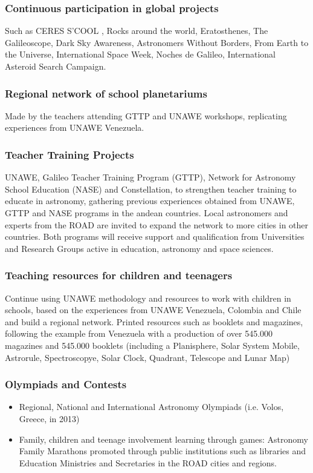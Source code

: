 \documentclass[12pt]{article}
\begin{document}
\subsubsection*{Continuous participation in  global projects} 

Such as  CERES S'COOL , Rocks around the world,  Eratosthenes, The
Galileoscope,  Dark Sky Awareness, Astronomers Without Borders, From
Earth to the Universe, International Space Week,   Noches de Galileo,
International Asteroid Search Campaign. 

\subsubsection*{Regional network of school planetariums} 

Made by the teachers attending GTTP and UNAWE workshops, replicating
experiences from UNAWE Venezuela.  

\subsubsection*{Teacher Training Projects}
UNAWE, Galileo Teacher Training Program (GTTP), Network for Astronomy
School Education (NASE) and Constellation, to strengthen teacher
training to educate in astronomy, gathering previous experiences
obtained from UNAWE, GTTP and NASE programs in the andean
countries. Local astronomers and experts from the ROAD are
invited to expand the network to more cities in other countries. Both
programs will receive support and qualification from Universities and
Research Groups active in education, astronomy and space sciences. 

\subsubsection*{Teaching resources for children and teenagers}
Continue using UNAWE methodology and resources to work with children
in schools, based on the experiences from  UNAWE Venezuela, Colombia
and Chile and build a regional network. Printed resources such as
booklets and magazines, following the example from Venezuela with a
production of over 545.000 magazines and 545.000 booklets (including a
Planisphere, Solar System Mobile, Astrorule, Spectroscopye, Solar
Clock, Quadrant, Telescope and Lunar Map) 

\subsubsection*{Olympiads and Contests}
\begin{itemize}
\item Regional, National and International Astronomy Olympiads
  (i.e. Volos, Greece, in 2013) 
\item Family, children and teenage involvement learning through games:
  Astronomy Family Marathons promoted through public institutions such
  as libraries and Education Ministries and Secretaries in the ROAD
  cities and regions.  
\end{itemize}
\end{document}
